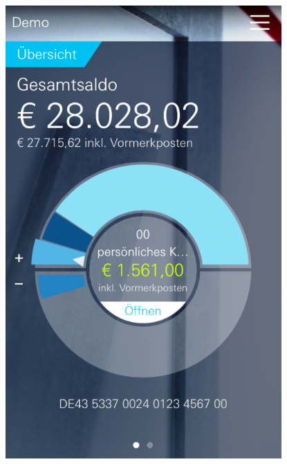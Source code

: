 \begin{figure}[H] 
    \begin{minipage}[b]{.5\linewidth}
        \centering\includegraphics[width=0.94\textwidth]{img/screenshots/ex4p1.png}
    \end{minipage}%
    \begin{minipage}[b]{.5\linewidth}

\end{minipage}
\end{figure}
